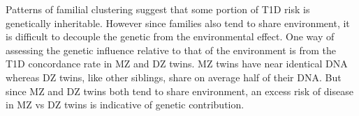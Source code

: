 
Patterns of familial clustering suggest that some portion of T1D risk is genetically inheritable.
However since families also tend to share environment, it is difficult to decouple the genetic from the environmental effect.
One way of assessing the genetic influence relative to that of the environment is from the T1D concordance rate in \gls{MZ} and \gls{DZ} twins.
MZ twins have near identical \gls{DNA} whereas DZ twins, like other siblings, share on average half of their DNA.
But since \gls{MZ} and \gls{DZ} twins both tend to share environment,
an excess risk of disease in \gls{MZ} vs \gls{DZ} twins is indicative of genetic contribution.


